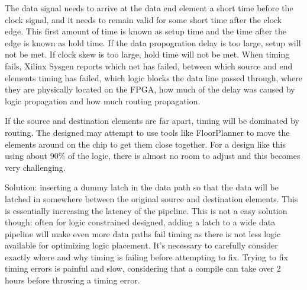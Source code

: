 The data signal needs to arrive at the data end element a short time before the clock signal, and it needs to remain valid for some short time after the clock edge. This first amount of time is known as setup time and the time after the edge is known as hold time. If the data propogration delay is too large, setup will not be met. If clock skew is too large, hold time will not be met.
When timing fails, Xilinx Sysgen reports which net has failed, between which source and end elements timing has failed, which logic blocks the data line passed through, where they are physically located on the FPGA, how much of the delay was caused by logic propagation and how much routing propagation. 

If the source and destination elements are far apart, timing will be dominated by routing. The designed may attempt to use tools like FloorPlanner to move the elements around on the chip to get them close together. For a design like this using about 90\% of the logic, there is almost no room to adjust and this becomes very challenging. 

Solution: inserting a dummy latch in the data path so that the data will be latched in somewhere between the original source and destination elements. This is essentially increasing the latency of the pipeline. This is not a easy solution though: often for logic constrained designed, adding a latch to a wide data pipeline will make even more data paths fail timing as there is not less logic available for optimizing logic placement. It's necessary to carefully consider exactly where and why timing is failing before attempting to fix. Trying to fix timing errors is painful and slow, considering that a compile can take over 2 hours before throwing a timing error. 

